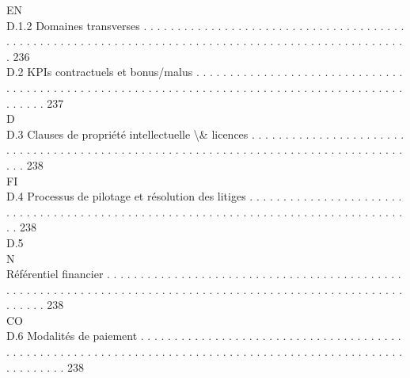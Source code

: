 \vspace{0.5em}
\vspace{0.5em}
\vspace{0.5em}
\vspace{0.5em}
EN\\
D.1.2               Domaines transverses . . . . . . . . . . . . . . . . . . . . . . . . . . . . . . . . . . . . . . . . . . . . . . . . . . . . . . . . . . . . . . . . . . . . . . . . . . . . . . . . . . . . . . . . . . . . . . . . . . . 236\\
D.2     KPIs contractuels et bonus/malus . . . . . . . . . . . . . . . . . . . . . . . . . . . . . . . . . . . . . . . . . . . . . . . . . . . . . . . . . . . . . . . . . . . . . . . . . . . . . . . . . . . . . . . . . . . . . . . . 237\\
\vspace{0.5em}
\vspace{0.5em}
\vspace{0.5em}
\vspace{0.5em}
D\\
D.3     Clauses de propriété intellectuelle \textbackslash{}& licences . . . . . . . . . . . . . . . . . . . . . . . . . . . . . . . . . . . . . . . . . . . . . . . . . . . . . . . . . . . . . . . . . . . . . . . . . . . . . . . . . . . . . 238\\
\vspace{0.5em}
\vspace{0.5em}
\vspace{0.5em}
\vspace{0.5em}
FI\\
D.4     Processus de pilotage et résolution des litiges . . . . . . . . . . . . . . . . . . . . . . . . . . . . . . . . . . . . . . . . . . . . . . . . . . . . . . . . . . . . . . . . . . . . . . . . . . . . . . . . . . . . 238\\
D.5\\
N\\
Référentiel financier . . . . . . . . . . . . . . . . . . . . . . . . . . . . . . . . . . . . . . . . . . . . . . . . . . . . . . . . . . . . . . . . . . . . . . . . . . . . . . . . . . . . . . . . . . . . . . . . . . . . . . . . . . . . . 238\\
CO\\
D.6     Modalités de paiement . . . . . . . . . . . . . . . . . . . . . . . . . . . . . . . . . . . . . . . . . . . . . . . . . . . . . . . . . . . . . . . . . . . . . . . . . . . . . . . . . . . . . . . . . . . . . . . . . . . . . . . . . . . 238\\
